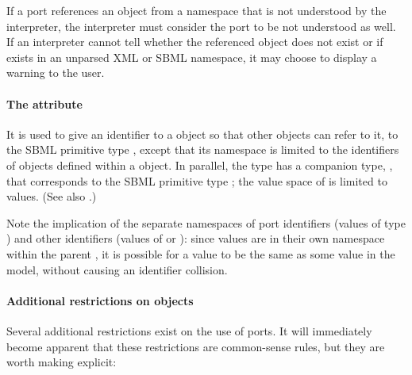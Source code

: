 If a port references an object from a namespace that is not understood by the interpreter, the interpreter must consider the port to be not understood as well.  If an interpreter cannot tell whether the referenced object does not exist or if exists in an unparsed XML or SBML namespace, it may choose to display a warning to the user.

\paragraph{The \fixttspace{} attribute}

  It is used to give an identifier to a \Port object so that other objects can refer to it,  to the SBML primitive type , except that its namespace is limited to the identifiers of \Port objects defined within a \Model object.  In parallel, the  type has a companion type, , that corresponds to the SBML primitive type ; the value space of  is limited to  values.  (See also .)

Note the implication of the separate namespaces of port identifiers (values of type ) and other identifiers (values of  or ): since  values are in their own namespace within the parent \Model, it is possible for a  value to be the same as some  value in the model, without causing an identifier collision.


\paragraph{Additional restrictions on  objects}

Several additional restrictions exist on the use of ports.  It will immediately become apparent that these restrictions are common-sense rules, but they are worth making explicit:

